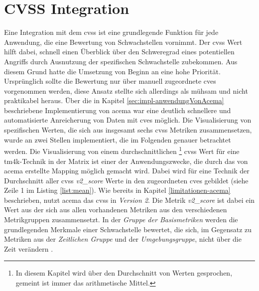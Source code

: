 \section{CVSS Integration} 
\label{sec:impl-cvssIntegration}
Eine Integration mit dem \gls{cvss} ist eine grundlegende Funktion für jede Anwendung, die eine Bewertung von Schwachstellen vornimmt. Der \gls{cvss} Wert hilft dabei, schnell einen Überblick über den Schweregrad eines potentiellen Angriffs durch Ausnutzung der spezifischen Schwachstelle zubekommen. Aus diesem Grund hatte die Umsetzung von Beginn an eine hohe Priorität. Ursprünglich sollte die Bewertung nur über manuell zugeordnete \glspl{cve} vorgenommen werden, diese Ansatz stellte sich allerdings als mühsam und nicht praktikabel heraus. Über die in Kapitel \ref{sec:impl-anwendungVonAcema} beschriebene Implementierung von \gls{acema} war eine deutlich schnellere und automatisierte Anreicherung von Daten mit \glspl{cve} möglich. Die Visualisierung von spezifischen Werten, die sich aus insgesamt sechs \gls{cvss} Metriken zusammensetzen, wurde an zwei Stellen implementiert, die im Folgenden genauer betrachtet werden.
Die Visualisierung von einem durchschnittlichen \footnote{In diesem Kapitel wird über den Durchschnitt von Werten gesprochen, gemeint ist immer das arithmetische Mittel.} \gls{cvss} Wert für eine \gls{tm4k}-Technik in der Matrix ist einer der Anwendungszwecke, die durch das von \gls{acema} erstellte Mapping möglich gemacht wird. Dabei wird für eine Technik der Durchschnitt aller \gls{cvss} \textit{v2\_score} Werte in den zugeordneten \glspl{cve} gebildet (siehe Zeile 1 im Listing \ref{list:mean}).  Wie bereits in Kapitel \ref{limitationen-acema} beschrieben, nutzt \gls{acema} das \gls{cvss} in \textit{Version 2}. Die Metrik \textit{v2\_score} ist dabei ein Wert aus der sich aus allen vorhandenen Metriken aus den verschiedenen Metrikgruppen zusammensetzt. In der \textit{Gruppe der Basismetriken} werden die grundlegenden Merkmale einer Schwachstelle bewertet, die sich, im Gegensatz zu Metriken aus der \textit{Zeitlichen Gruppe} und der \textit{Umgebungsgruppe}, nicht über die Zeit verändern \autocite{CVSSV2Complete}.

